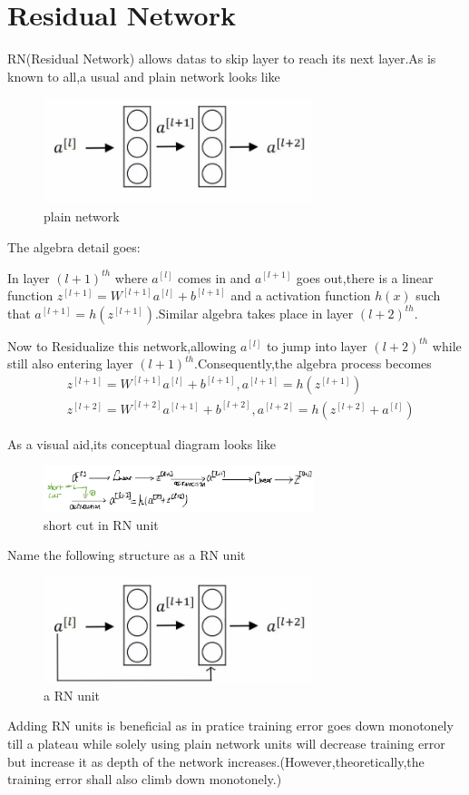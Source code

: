 \documentclass{article}
\begin{document}
\section{Residual Network}
RN(Residual Network) allows datas to skip layer to reach its next layer.As is known to all,a usual and plain network looks like
\begin{figure}[htbp]
	\centering
	\includegraphics[width=0.7\textwidth]{8.jpg}
	\caption{plain network}
\end{figure}
The algebra detail goes:
\par In layer $(l+1)^{th}$  where $a^{[l]}$ comes in and $a^{[l+1]}$ goes out,there is a linear function $z^{[l+1]}=W^{[l+1]}a^{[l]}+b^{[l+1]}$ and a activation function $h(x)$ such that $a^{[l+1]}=h(z^{[l+1]})$.Similar algebra takes place in layer $(l+2)^{th}$.
\par Now to Residualize this network,allowing $a^{[l]}$ to jump into layer $(l+2)^{th}$ while still also entering layer $(l+1)^{th}$.Consequently,the algebra process becomes
\begin{align*}
	&z^{[l+1]}=W^{[l+1]}a^{[l]}+b^{[l+1]},a^{[l+1]}=h(z^{[l+1]})\\
	&z^{[l+2]}=W^{[l+2]}a^{[l+1]}+b^{[l+2]},a^{[l+2]}=h(z^{[l+2]}+a^{[l]})
\end{align*}
\vspace{0.4\textheight}
\par As a visual aid,its conceptual diagram looks like
\begin{figure}[htbp]
	\centering
	\includegraphics[width=0.7\textwidth]{9.jpg}
	\caption{short cut in RN unit}
\end{figure}
\par Name the following structure as a RN unit
\begin{figure}[htbp]
	\centering
	\includegraphics[width=0.7\textwidth]{10.jpg}
	\caption{a RN unit}
\end{figure}
\par Adding RN units is beneficial as in pratice training error goes down monotonely till a plateau while solely using plain network units will decrease training error but increase it as depth of the network increases.(However,theoretically,the training error shall also climb down monotonely.)
\end{document}
